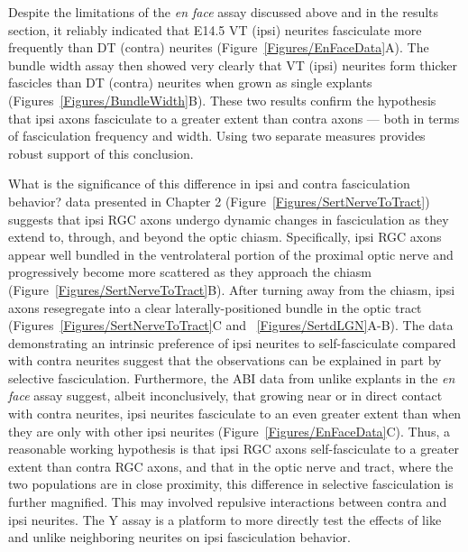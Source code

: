 Despite the limitations of the \emph{en face} assay discussed above and in the results section, it reliably indicated that E14.5 VT (ipsi) neurites fasciculate more frequently than DT (contra) neurites (Figure~\ref{Figures/EnFaceData}A).
The bundle width assay then showed very clearly that VT (ipsi) neurites form thicker fascicles than DT (contra) neurites when grown as single explants (Figures~\ref{Figures/BundleWidth}B).
These two results confirm the hypothesis that ipsi axons fasciculate to a greater extent than contra axons --- both in terms of fasciculation frequency and width.
Using two separate measures provides robust support of this conclusion.

What is the significance of this difference in ipsi and contra fasciculation behavior?
\Invivo{} data presented in Chapter 2 (Figure~\ref{Figures/SertNerveToTract}) suggests that ipsi RGC axons undergo dynamic changes in fasciculation as they extend to, through, and beyond the optic chiasm.
Specifically, ipsi RGC axons appear well bundled in the ventrolateral portion of the proximal optic nerve and progressively become more scattered as they approach the chiasm (Figure~\ref{Figures/SertNerveToTract}B).
After turning away from the chiasm, ipsi axons resegregate into a clear laterally-positioned bundle in the optic tract (Figures~\ref{Figures/SertNerveToTract}C and ~\ref{Figures/SertdLGN}A-B).
The \invitro{} data demonstrating an intrinsic preference of ipsi neurites to self-fasciculate compared with contra neurites suggest that the \invivo{} observations can be explained in part by selective fasciculation.
Furthermore, the ABI data from unlike explants in the \emph{en face} assay suggest, albeit inconclusively, that growing near or in direct contact with contra neurites, ipsi neurites fasciculate to an even greater extent than when they are only with other ipsi neurites (Figure~\ref{Figures/EnFaceData}C).
Thus, a reasonable working hypothesis is that ipsi RGC axons self-fasciculate to a greater extent than contra RGC axons, and that in the optic nerve and tract, where the two populations are in close proximity, this difference in selective fasciculation is further magnified.
This may involved repulsive interactions between contra and ipsi neurites.
The Y assay is a platform to more directly test the effects of like and unlike neighboring neurites on ipsi fasciculation behavior.

